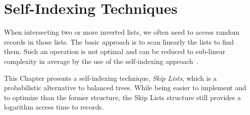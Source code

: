 \chapter{Self-Indexing Techniques}{
When intersecting two or more inverted lists, we often need to
access random records in those lists. The basic approach is to scan linearly
the lists to find them. Such an operation is not optimal and can be
reduced to sub-linear complexity in average by the use of the self-indexing
approach~\cite{moffat:96}.

This Chapter presents a self-indexing technique, \emph{Skip Lists}, which is a
probabilistic alternative to balanced trees. While being easier to implement
and to optimize than the former structure, the Skip Lists structure still
provides a logarithm access time to records.
}
\label{chap:self-indexing}


